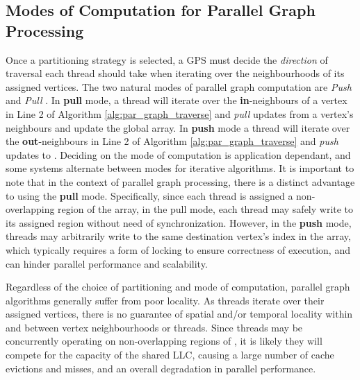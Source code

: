 \subsection{Modes of Computation for Parallel Graph Processing}

Once a partitioning strategy is selected, a \ac{GPS} must decide the \textit{direction} of traversal each thread should take when iterating over the neighbourhoods of its assigned vertices. The two natural modes of parallel graph computation are \textit{Push} and \textit{Pull} \cite{ligra, dobfs, pvp}. In \textbf{pull} mode, a thread will iterate over the \textbf{in}-neighbours of a vertex in Line 2 of Algorithm \ref{alg:par_graph_traverse} and \textit{pull} updates from a vertex's neighbours and update the global \vdata{} array. In \textbf{push} mode a thread will iterate over the \textbf{out}-neighbours in Line 2 of Algorithm \ref{alg:par_graph_traverse} and \textit{push} updates to \vdata{}. Deciding on the mode of computation is application dependant, and some systems \cite{ligra, dobfs} alternate between modes for iterative algorithms. It is important to note that in the context of parallel graph processing, there is a distinct advantage to using the \textbf{pull} mode. Specifically, since each thread is assigned a non-overlapping region of the \vdata{} array, in the pull mode, each thread may safely write to its assigned region without need of synchronization. However, in the \textbf{push} mode, threads may arbitrarily write to the same destination vertex's index in the \vdata{} array, which typically requires a form of locking to ensure correctness of execution, and can hinder parallel performance and scalability. 


Regardless of the choice of partitioning and mode of computation, parallel graph algorithms generally suffer from poor locality.  As threads iterate over their assigned vertices, there is no guarantee of spatial and/or temporal locality within and between vertex neighbourhoods or threads. Since threads may be concurrently operating on non-overlapping regions of \vdata{}, it is likely they will compete for the capacity of the shared LLC, causing a large number of cache evictions and misses, and an overall degradation in parallel performance.


